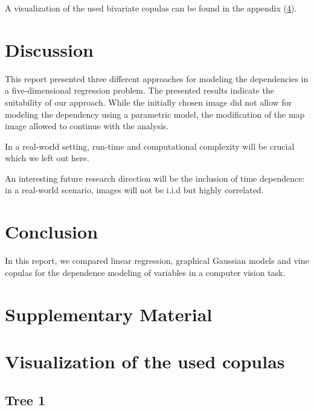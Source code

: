 \documentclass{article}
\begin{document}
A visualization of the used bivariate copulas can be found in the
appendix (\ref{sec:copulas}).
     
\section{Discussion}
\label{sec:discussion}

This report presented three different approaches for modeling the
dependencies in a five-dimensional regression problem. The presented
results indicate the suitability of our approach. While the initially
chosen image did not allow for modeling the dependency using a
parametric model, the modification of the map image allowed to
continue with the analysis.

In a real-world setting, run-time and computational complexity will be
crucial which we left out here.

An interesting future research direction will be the inclusion of time
dependence: in a real-world scenario, images will not be i.i.d but
highly correlated.


\section{Conclusion}
\label{sec:conclusion}


In this report, we compared linear regression, graphical Gaussian
models and vine copulas for the dependence modeling of variables in a
computer vision task. 

\printbibliography
\appendix

\section{Supplementary Material}

\section{Visualization of the used copulas}
\label{sec:copulas}

\subsection{Tree 1}
\end{document}
